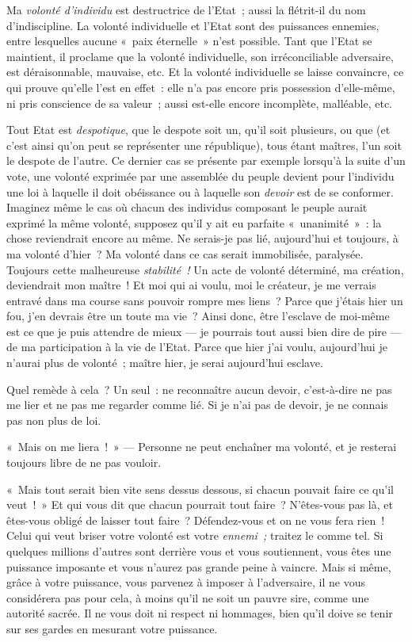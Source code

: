 \documentclass[french,twoside]{book} %
\begin{document}
Ma \emph{volonté d’individu} est destructrice de l’Etat ; aussi la flétrit-il du nom d’indiscipline. La volonté individuelle et l’Etat sont des puissances ennemies, entre lesquelles aucune « paix éternelle » n’est possible. Tant que l’Etat se maintient, il proclame que la volonté individuelle, son irréconciliable adversaire, est déraisonnable, mauvaise, etc. Et la volonté individuelle se laisse convaincre, ce qui prouve qu’elle l’est en effet : elle n’a pas encore pris possession d’elle-même, ni pris conscience de sa valeur ; aussi est-elle encore incomplète, malléable, etc.\par
Tout Etat est \emph{despotique}, que le despote soit un, qu’il soit plusieurs, ou que (et c’est ainsi qu’on peut se représenter une république), tous étant maîtres, l’un soit le despote de l’autre. Ce dernier cas se présente par exemple lorsqu’à la suite d’un vote, une volonté exprimée par une assemblée du peuple devient pour l’individu une loi à laquelle il doit obéissance  ou à laquelle son \emph{devoir} est de se conformer. Imaginez même le cas où chacun des individus composant le peuple aurait exprimé la même volonté, supposez qu’il y ait eu parfaite « unanimité » : la chose reviendrait encore au même. Ne serais-je pas lié, aujourd’hui et toujours, à ma volonté d’hier ? Ma volonté dans ce cas serait immobilisée, paralysée. Toujours cette malheureuse \emph{stabilité !} Un acte de volonté déterminé, ma création, deviendrait mon maître ! Et moi qui ai voulu, moi le créateur, je me verrais entravé dans ma course sans pouvoir rompre mes liens ? Parce que j’étais hier un fou, j’en devrais être un toute ma vie ? Ainsi donc, être l’esclave de moi-même est ce que je puis attendre de mieux — je pourrais tout aussi bien dire de pire — de ma participation à la vie de l’Etat. Parce que hier j’ai voulu, aujourd’hui je n’aurai plus de volonté ; maître hier, je serai aujourd’hui esclave.\par
Quel remède à cela ? Un seul : ne reconnaître aucun devoir, c’est-à-dire ne pas me lier et ne pas me regarder comme lié. Si je n’ai pas de devoir, je ne connais pas non plus de loi.\par
« Mais on me liera ! » — Personne ne peut enchaîner ma volonté, et je resterai toujours libre de ne pas vouloir.\par
« Mais tout serait bien vite sens dessus dessous, si chacun pouvait faire ce qu’il veut ! » Et qui vous dit que chacun pourrait tout faire ? N’êtes-vous pas là, et êtes-vous obligé de laisser tout faire ? Défendez-vous et on ne vous fera rien ! Celui qui veut briser votre volonté est votre \emph{ennemi ;} traitez le comme tel. Si quelques millions d’autres sont derrière vous et vous soutiennent, vous êtes une puissance imposante et vous n’aurez pas grande peine à vaincre. Mais si même, grâce à votre puissance, vous parvenez à imposer à l’adversaire, il ne vous considérera pas pour cela, à moins qu’il ne soit un pauvre sire, comme une autorité sacrée. Il ne vous doit ni respect ni hommages, bien  qu’il doive se tenir sur ses gardes en mesurant votre puissance.\par
\end{document}
